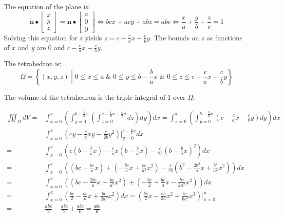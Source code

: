 \documentclass{article}
\begin{document}
\begin{itemize}
The equation of the plane is: 
\[\mathbf{n} \bullet \begin{bmatrix} x \\ y \\ z \end{bmatrix} = \mathbf{n} \bullet \begin{bmatrix} a \\ 0 \\ 0 \end{bmatrix} 
\iff bc x + ac y + ab z = abc \iff \frac{x}{a} + \frac{y}{b} + \frac{z}{c} = 1\]
Solving this equation for \(z\) yields \(z = c - \frac{c}{a}x - \frac{c}{b}y\). 
The bounds on \(z\) as functions of \(x\) and \(y\) are \(0\) and \(c - \frac{c}{a}x - \frac{c}{b}y\).  

The tetrahedron is:
\[\Omega = \left\{(x,y,z) \middle| 0 \leq x \leq a \;\&\; 0 \leq y \leq b - \frac{b}{a}x \;\&\; 0 \leq z \leq c - \frac{c}{a}x - \frac{c}{b}y \right\}\]

The volume of the tetrahedron is the triple integral of \(1\) over \(\Omega\): 

\begin{align*}
\iiint_{\Omega} dV = & 
\int_{x = 0}^a \left(\int_{y = 0}^{b - \frac{b}{a}x} \left(\int_{z = 0}^{c - \frac{c}{a}x - \frac{c}{b}y} dz\right)dy\right)dx 
= \int_{x = 0}^a \left(\int_{y = 0}^{b - \frac{b}{a}x} \left(c - \frac{c}{a}x - \frac{c}{b}y\right)dy\right)dx \\  
= & \int_{x = 0}^a \left(cy - \frac{c}{a}xy - \frac{c}{2b}y^2\right)\bigg|_{y = 0}^{b - \frac{b}{a}x} dx \\ 
= & \int_{x = 0}^a \left(c\left(b - \frac{b}{a}x\right) - \frac{c}{a}x\left(b - \frac{b}{a}x\right) - \frac{c}{2b}\left(b - \frac{b}{a}x\right)^2\right)dx \\ 
= & \int_{x = 0}^a \left(\left(bc - \frac{bc}{a}x\right) + \left(-\frac{bc}{a}x + \frac{bc}{a^2}x^2\right) - \frac{c}{2b}\left(b^2 - \frac{2b^2}{a}x + \frac{b^2}{a^2}x^2\right)\right)dx \\   
= & \int_{x = 0}^a \left(\left(bc - \frac{2bc}{a}x + \frac{bc}{a^2}x^2\right) + \left(-\frac{bc}{2} + \frac{bc}{a}x - \frac{bc}{2a^2}x^2\right)\right)dx \\   
= & \int_{x = 0}^a \left(\frac{bc}{2} - \frac{bc}{a}x + \frac{bc}{2a^2}x^2\right)dx   
= \left(\frac{bc}{2}x - \frac{bc}{2a}x^2 + \frac{bc}{6a^2}x^3\right)\bigg|_{x = 0}^a \\ 
= & \frac{abc}{2} - \frac{abc}{2} + \frac{abc}{6} 
= \frac{abc}{6}
\end{align*}


\end{itemize}
\end{document}
